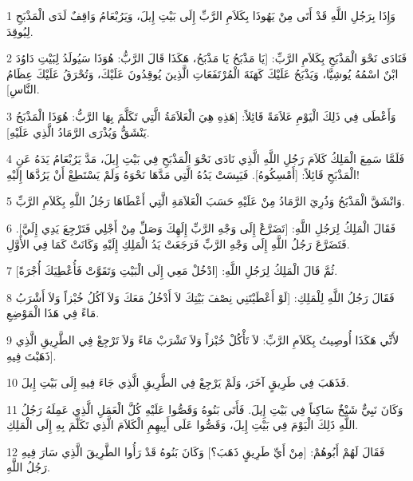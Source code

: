 \par 1 وَإِذَا بِرَجُلِ اللَّهِ قَدْ أَتَى مِنْ يَهُوذَا بِكَلاَمِ الرَّبِّ إِلَى بَيْتِ إِيلَ، وَيَرُبْعَامُ وَاقِفٌ لَدَى الْمَذْبَحِ لِيُوقِدَ.
\par 2 فَنَادَى نَحْوَ الْمَذْبَحِ بِكَلاَمِ الرَّبِّ: [يَا مَذْبَحُ يَا مَذْبَحُ، هَكَذَا قَالَ الرَّبُّ: هُوَذَا سَيُولَدُ لِبَيْتِ دَاوُدَ ابْنٌ اسْمُهُ يُوشِيَّا، وَيَذْبَحُ عَلَيْكَ كَهَنَةَ الْمُرْتَفَعَاتِ الَّذِينَ يُوقِدُونَ عَلَيْكَ، وَتُحْرَقُ عَلَيْكَ عِظَامُ النَّاسِ].
\par 3 وَأَعْطَى فِي ذَلِكَ الْيَوْمِ عَلاَمَةً قَائِلاً: [هَذِهِ هِيَ الْعَلاَمَةُ الَّتِي تَكَلَّمَ بِهَا الرَّبُّ: هُوَذَا الْمَذْبَحُ يَنْشَقُّ وَيُذْرَى الرَّمَادُ الَّذِي عَلَيْهِ].
\par 4 فَلَمَّا سَمِعَ الْمَلِكُ كَلاَمَ رَجُلِ اللَّهِ الَّذِي نَادَى نَحْوَ الْمَذْبَحِ فِي بَيْتِ إِيلَ، مَدَّ يَرُبْعَامُ يَدَهُ عَنِ الْمَذْبَحِ قَائِلاً: [أَمْسِكُوهُ]. فَيَبِسَتْ يَدُهُ الَّتِي مَدَّهَا نَحْوَهُ وَلَمْ يَسْتَطِعْ أَنْ يَرُدَّهَا إِلَيْهِ!
\par 5 وَانْشَقَّ الْمَذْبَحُ وَذُرِيَ الرَّمَادُ مِنْ عَلَيْهِ حَسَبَ الْعَلاَمَةِ الَّتِي أَعْطَاهَا رَجُلُ اللَّهِ بِكَلاَمِ الرَّبِّ.
\par 6 فَقَالَ الْمَلِكُ لِرَجُلِ اللَّهِ: [تَضَرَّعْ إِلَى وَجْهِ الرَّبِّ إِلَهِكَ وَصَلِّ مِنْ أَجْلِي فَتَرْجِعَ يَدِي إِلَيَّ]. فَتَضَرَّعَ رَجُلُ اللَّهِ إِلَى وَجْهِ الرَّبِّ فَرَجَعَتْ يَدُ الْمَلِكِ إِلَيْهِ وَكَانَتْ كَمَا فِي الأَوَّلِ.
\par 7 ثُمَّ قَالَ الْمَلِكُ لِرَجُلِ اللَّهِ: [ادْخُلْ مَعِي إِلَى الْبَيْتِ وَتَقَوَّتْ فَأُعْطِيَكَ أُجْرَةً].
\par 8 فَقَالَ رَجُلُ اللَّهِ لِلْمَلِكِ: [لَوْ أَعْطَيْتَنِي نِصْفَ بَيْتِكَ لاَ أَدْخُلُ مَعَكَ وَلاَ آكُلُ خُبْزاً وَلاَ أَشْرَبُ مَاءً فِي هَذَا الْمَوْضِعِ.
\par 9 لأَنِّي هَكَذَا أُوصِيتُ بِكَلاَمِ الرَّبِّ: لاَ تَأْكُلْ خُبْزاً وَلاَ تَشْرَبْ مَاءً وَلاَ تَرْجِعْ فِي الطَّرِيقِ الَّذِي ذَهَبْتَ فِيهِ].
\par 10 فَذَهَبَ فِي طَرِيقٍ آخَرَ، وَلَمْ يَرْجِعْ فِي الطَّرِيقِ الَّذِي جَاءَ فِيهِ إِلَى بَيْتِ إِيلَ.
\par 11 وَكَانَ نَبِيٌّ شَيْخٌ سَاكِناً فِي بَيْتِ إِيلَ. فَأَتَى بَنُوهُ وَقَصُّوا عَلَيْهِ كُلَّ الْعَمَلِ الَّذِي عَمِلَهُ رَجُلُ اللَّهِ ذَلِكَ الْيَوْمَ فِي بَيْتِ إِيلَ، وَقَصُّوا عَلَى أَبِيهِمِ الْكَلاَمَ الَّذِي تَكَلَّمَ بِهِ إِلَى الْمَلِكِ.
\par 12 فَقَالَ لَهُمْ أَبُوهُمْ: [مِنْ أَيِّ طَرِيقٍ ذَهَبَ؟] وَكَانَ بَنُوهُ قَدْ رَأُوا الطَّرِيقَ الَّذِي سَارَ فِيهِ رَجُلُ اللَّهِ.
